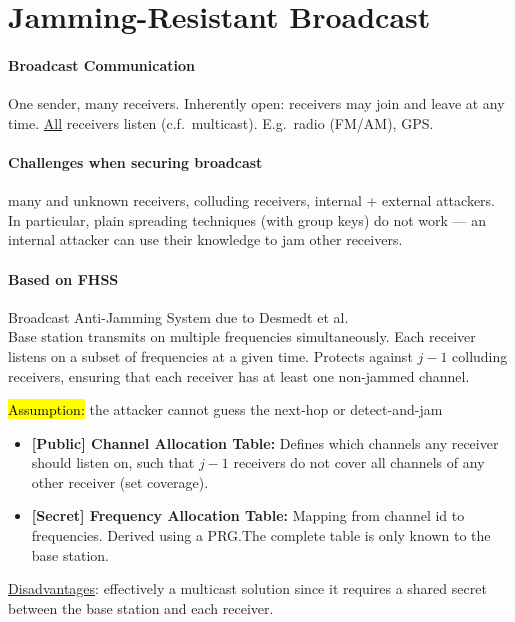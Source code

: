 \section{Jamming-Resistant Broadcast}

\paragraph{Broadcast Communication}
One sender, many receivers. Inherently open: receivers may join and leave at any time. \underline{All} receivers listen (c.f.\ multicast). E.g.\ radio (FM/AM), GPS.\@

\paragraph{Challenges when securing broadcast}
many and unknown receivers, colluding receivers, internal + external attackers.
In particular, plain spreading techniques (with group keys) do not work --- an internal attacker can use their knowledge to jam other receivers.

\paragraph{Based on FHSS}
Broadcast Anti-Jamming System due to Desmedt et al. \\
Base station transmits on multiple frequencies simultaneously.
Each receiver listens on a subset of frequencies at a given time.
Protects against $j-1$ colluding receivers, ensuring that each receiver has at least one non-jammed channel.

\hl{Assumption:} the attacker cannot guess the next-hop or detect-and-jam

\begin{itemize}
	\item \textbf{[Public] Channel Allocation Table:}
	Defines which channels any receiver should listen on, such that $j-1$ receivers do not cover all channels of any other receiver (set coverage).
	\item \textbf{[Secret] Frequency Allocation Table:}
	Mapping from channel id to frequencies. Derived using a PRG.\@ The complete table is only known to the base station.
\end{itemize}

\underline{Disadvantages}:
effectively a multicast solution since it requires a shared secret between the base station and each receiver.

